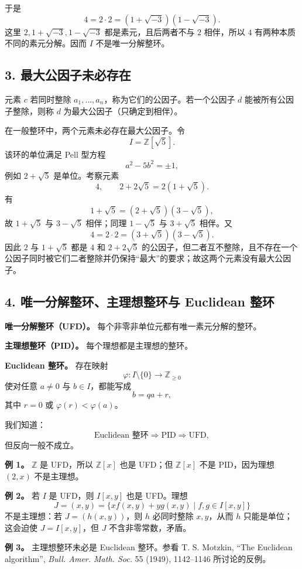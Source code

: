 于是
\[
4=2\cdot2=(1+\sqrt{-3})(1-\sqrt{-3}).
\]
这里 $2,1+\sqrt{-3},1-\sqrt{-3}$ 都是素元，且后两者不与 $2$ 相伴，所以 $4$ 有两种本质不同的素元分解。因而 $I$ 不是唯一分解整环。

\subsection*{3. 最大公因子未必存在}

元素 $c$ 若同时整除 $a_1,\ldots,a_n$，称为它们的公因子。若一个公因子 $d$ 能被所有公因子整除，则称 $d$ 为最大公因子（只确定到相伴）。

在一般整环中，两个元素未必存在最大公因子。令
\[
I=\mathbb Z[\sqrt5].
\]
该环的单位满足 Pell 型方程
\[
a^2-5b^2=\pm1,
\]
例如 $2+\sqrt5$ 是单位。考察元素
\[
4,
\qquad
2+2\sqrt5=2(1+\sqrt5).
\]
有
\[
1+\sqrt5=(2+\sqrt5)(3-\sqrt5),
\]
故 $1+\sqrt5$ 与 $3-\sqrt5$ 相伴；同理 $1-\sqrt5$ 与 $3+\sqrt5$ 相伴。又
\[
4=2\cdot2=(3+\sqrt5)(3-\sqrt5).
\]
因此 $2$ 与 $1+\sqrt5$ 都是 $4$ 和 $2+2\sqrt5$ 的公因子，但二者互不整除，且不存在一个公因子同时被它们二者整除并仍保持“最大”的要求；故这两个元素没有最大公因子。

\subsection*{4. 唯一分解整环、主理想整环与 Euclidean 整环}

\textbf{唯一分解整环（UFD）。} 每个非零非单位元都有唯一素元分解的整环。

\textbf{主理想整环（PID）。} 每个理想都是主理想的整环。

\textbf{Euclidean 整环。} 存在映射
\[
\varphi:I\setminus\{0\}\longrightarrow\mathbb Z_{\ge0}
\]
使对任意 $a\ne0$ 与 $b\in I$，都能写成
\[
b=qa+r,
\]
其中 $r=0$ 或 $\varphi(r)<\varphi(a)$。

我们知道：
\[
\text{Euclidean 整环}\Longrightarrow\text{PID}\Longrightarrow\text{UFD},
\]
但反向一般不成立。

\textbf{例 1。} $\mathbb Z$ 是 UFD，所以 $\mathbb Z[x]$ 也是 UFD；但 $\mathbb Z[x]$ 不是 PID，因为理想 $(2,x)$ 不是主理想。

\textbf{例 2。} 若 $I$ 是 UFD，则 $I[x,y]$ 也是 UFD。理想
\[
J=(x,y)=\{xf(x,y)+yg(x,y)\mid f,g\in I[x,y]\}
\]
不是主理想：若 $J=(h(x,y))$，则 $h$ 必同时整除 $x,y$，从而 $h$ 只能是单位；这会迫使 $J=I[x,y]$，但 $J$ 不含非零常数，矛盾。

\textbf{例 3。} 主理想整环未必是 Euclidean 整环。参看 T. S. Motzkin, ``The Euclidean algorithm'', \emph{Bull. Amer. Math. Soc.} 55 (1949), 1142--1146 所讨论的反例。
